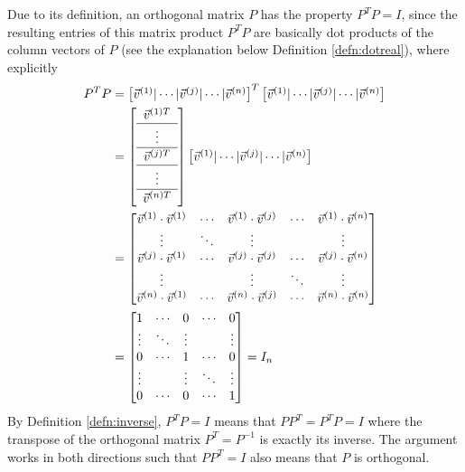 Due to its definition, an orthogonal matrix $P$ has the property $P^TP = I$, since the resulting entries of this matrix product $P^TP$ are basically dot products of the column vectors of $P$ (see the explanation below Definition \ref{defn:dotreal}), where explicitly
\begin{align*}
P^TP &= 
\begin{bmatrix}
\vec{v}^{(1)}|\cdots|\vec{v}^{(j)}|\cdots|\vec{v}^{(n)}   
\end{bmatrix}^T
\begin{bmatrix}
\vec{v}^{(1)}|\cdots|\vec{v}^{(j)}|\cdots|\vec{v}^{(n)}   
\end{bmatrix} \\
&= 
\left[
\begin{array}{c}
\vec{v}^{(1)T}\\
\hline
\vdots \\
\hline
\vec{v}^{(j)T} \Tstrut \\
\hline
\vdots \\
\hline
\vec{v}^{(n)T} \Tstrut 
\end{array}
\right]
\begin{bmatrix}
\vec{v}^{(1)}|\cdots|\vec{v}^{(j)}|\cdots|\vec{v}^{(n)}
\end{bmatrix} \\ 
&=
\begin{bmatrix}
\vec{v}^{(1)} \cdot \vec{v}^{(1)} & \cdots & \vec{v}^{(1)} \cdot \vec{v}^{(j)} & \cdots & \vec{v}^{(1)} \cdot \vec{v}^{(n)} \\
\vdots & \ddots & \vdots & & \vdots \\
\vec{v}^{(j)} \cdot \vec{v}^{(1)} & \cdots & \vec{v}^{(j)} \cdot \vec{v}^{(j)} & \cdots & \vec{v}^{(j)} \cdot \vec{v}^{(n)} \\
\vdots & & \vdots & \ddots & \vdots \\
\vec{v}^{(n)} \cdot \vec{v}^{(1)} & \cdots & \vec{v}^{(n)} \cdot \vec{v}^{(j)} & \cdots & \vec{v}^{(n)} \cdot \vec{v}^{(n)}
\end{bmatrix} \\
&=
\begin{bmatrix}
1 & \cdots & 0 & \cdots & 0 \\
\vdots & \ddots & \vdots & & \vdots \\
0 & \cdots & 1 & \cdots & 0 \\
\vdots & & \vdots & \ddots & \vdots \\
0 & \cdots & 0 & \cdots & 1
\end{bmatrix} = I_n
\end{align*}
By Definition \ref{defn:inverse}, $P^TP = I$ means that $PP^T = P^TP = I$ where the transpose of the orthogonal matrix $P^T = P^{-1}$ is exactly its inverse. The argument works in both directions such that $PP^T = I$ also means that $P$ is orthogonal.
